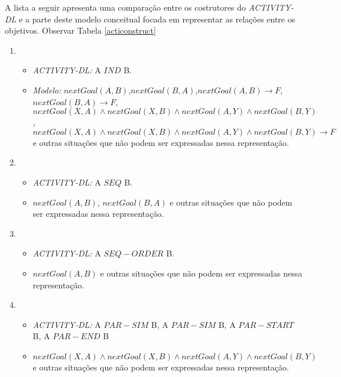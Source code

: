 A lista a seguir apresenta uma comparação entre os costrutores do \textit{ACTIVITY-DL} e a parte deste modelo conceitual focada em representar as relações entre os objetivos. Observar Tabela \ref{acticonstruct} 

\begin{enumerate}
	\item \begin{itemize}
			\item \textit{ACTIVITY-DL:}  A $IND$ B.
			\item \textit{Modelo:} $nextGoal(A,B)$,$nextGoal(B,A)$,$nextGoal(A,B) \to F$,$nextGoal(B,A) \to F$, $nextGoal(X,A) \wedge nextGoal(X,B) \wedge nextGoal(A,Y) \wedge nextGoal(B,Y)$, $nextGoal(X,A) \wedge nextGoal(X,B) \wedge nextGoal(A,Y) \wedge nextGoal(B,Y) \to F$   e outras situações que não podem ser expressadas nessa representação.
		\end{itemize}
	\item \begin{itemize}
			\item \textit{ACTIVITY-DL:} A $SEQ$ B.
			\item $nextGoal(A,B)$, $nextGoal(B,A)$ e outras situações que não podem ser expressadas nessa representação. 
		\end{itemize}
	\item \begin{itemize}
			\item \textit{ACTIVITY-DL:} A $SEQ-ORDER$ B.
			\item $nextGoal(A,B)$  e outras situações que não podem ser expressadas nessa representação.
		\end{itemize}
	\item \begin{itemize}
			\item \textit{ACTIVITY-DL:} A $PAR-SIM$ B, A $PAR-SIM$ B, A $PAR-START$ B, A $PAR-END$ B 
			\item $nextGoal(X,A) \wedge nextGoal(X,B) \wedge nextGoal(A,Y) \wedge nextGoal(B,Y) $ e outras situações que não podem ser expressadas nessa representação.  
		\end{itemize}
\end{enumerate} 